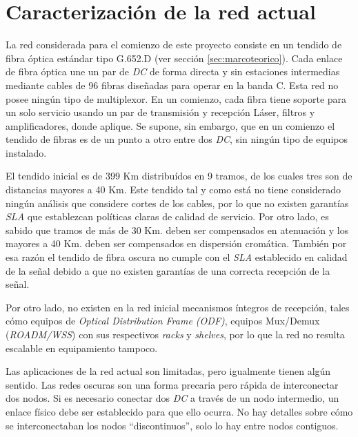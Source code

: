 \section{Caracterización de la red actual}
\label{sec:caracterizacion}

La red considerada para el comienzo de este proyecto consiste en un
tendido de fibra óptica estándar tipo G.652.D (ver sección
\ref{sec:marcoteorico}). Cada enlace de fibra óptica une un par de
\emph{DC} de forma directa y sin estaciones intermedias mediante
cables de 96 fibras diseñadas para operar en la banda C. Esta red no
posee ningún tipo de multiplexor. En un comienzo, cada fibra tiene
soporte para un solo servicio usando un par de transmisión y recepción
Láser, filtros y amplificadores, donde aplique. Se supone, sin
embargo, que en un comienzo el tendido de fibras es de un punto a otro
entre dos \emph{DC}, sin ningún tipo de equipos instalado.

El tendido inicial es de 399 Km distribuídos en 9 tramos, de los
cuales tres son de distancias mayores a 40 Km. Este tendido tal y como
está no tiene considerado ningún análisis que considere cortes de los
cables, por lo que no existen garantías \emph{SLA} que establezcan
políticas claras de calidad de servicio. Por otro lado, es sabido que
tramos de más de 30 Km. deben ser compensados en atenuación y los
mayores a 40 Km. deben ser compensados en dispersión
cromática. También por esa razón el tendido de fibra oscura no cumple
con el \emph{SLA} establecido en calidad de la señal debido a que no
existen garantías de una correcta recepción de la señal.

Por otro lado, no existen en la red inicial mecanismos íntegros de
recepción, tales cómo equipos de \textit{Optical Distribution Frame
  (ODF)}, equipos Mux/Demux (\textit{ROADM/WSS}) con sus respectivos
\textit{racks} y \textit{shelves}, por lo que la red no resulta
escalable en equipamiento tampoco.

Las aplicaciones de la red actual son limitadas, pero igualmente
tienen algún sentido. Las redes oscuras son una forma precaria pero
rápida de interconectar dos nodos. Si es necesario conectar dos
\emph{DC} a través de un nodo intermedio, un enlace físico debe ser
establecido para que ello ocurra. No hay detalles sobre cómo se
interconectaban los nodos ``discontinuos'', solo lo hay entre nodos
contiguos.



